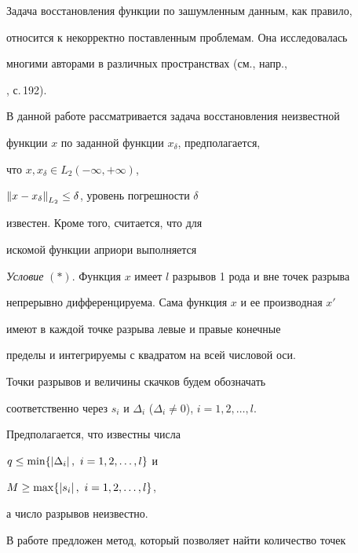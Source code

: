 

\maketitle


\label{begin}





Задача восстановления функции по зашумленным данным, как правило,


относится к некорректно поставленным проблемам. Она исследовалась


многими авторами в различных пространствах (см., напр.,


\cite{1}, с.\,192).


В данной работе рассматривается задача восстановления неизвестной


функции $x$ по заданной функции $x_{\delta}$, предполагается,


что $x,x_{\delta}\in L_2(-\infty,+\infty)$,


$\left\| x-x_\delta \right\|_{L_2}\leq \delta$, уровень погрешности $\delta$


известен. Кроме того, считается, что для


искомой функции априори выполняется





{\it Условие} $(*)$. Функция $x$ имеет $l$ разрывов 1 рода и вне точек разрыва


непрерывно дифференцируема. Сама функция $x$ и ее производная $x'$


имеют в каждой точке разрыва левые и правые конечные


пределы и интегрируемы с квадратом на всей числовой оси.


Точки разрывов и величины скачков будем обозначать


соответственно через $s_i$ и $\Delta_i$ ($\Delta_i \ne 0$), $i=1,2,\dotsc,l$.


Предполагается, что известны числа


$q\leq\min\{\Mod{\Delta_i},\ i=1,2,\dotsc,l\}$ и


$M\geq\max\{\Mod{s_i},\ i=1,2,\dotsc,l\}$,


а число разрывов неизвестно.





В работе предложен метод, который позволяет найти количество точек


